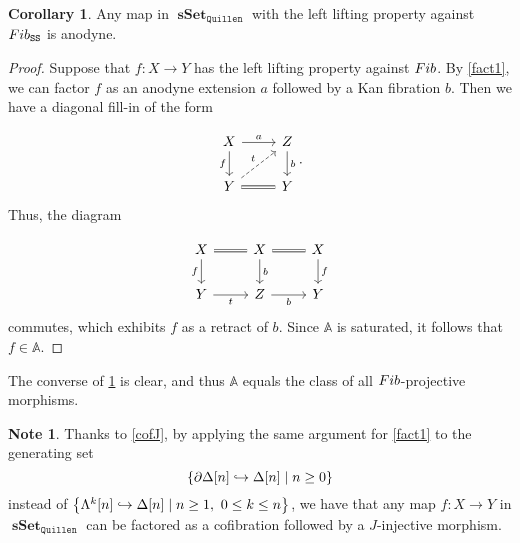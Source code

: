 \documentclass[10pt,letterpaper,cm]{nupset}
\theoremstyle{definition}
\newtheorem{note}[definition]{Note}
\theoremstyle{theorem}
\newtheorem{corollary}[definition]{Corollary}
\theoremstyle{remark}
\newcommand{\0}{\mathbf{0}}
\newcommand{\1}{\mathbf{1}}
\newcommand{\2}{\mathbf{2}}
\DeclareMathOperator{\sset}{\mathbf{sSet}}
\DeclareMathOperator{\fib}{\mathnormal{Fib}}
\begin{document}
\begin{corollary}\label{anocof}
Any map in $\sset_{\mathtt{Quillen}}$ with the left lifting property against $\fib_{\mathtt{SS}}$ is anodyne.
\end{corollary}
\begin{proof}
Suppose that $f: X \to Y$ has the left lifting property against $\fib$. By \cref{fact1}, we can factor $f$ as an anodyne extension $a$ followed by a Kan fibration $b$. Then we have a diagonal fill-in of the form

\[
\begin{tikzcd}
X \arrow[r, "a"] \arrow[d, "f"']    & Z \arrow[d, "b"] \\
Y \arrow[r, equal] \arrow[ru, "t", dashed] & Y               
\end{tikzcd}.
\] Thus, the diagram

\[
\begin{tikzcd}
X \arrow[r, equal] \arrow[d, "f"'] & X \arrow[r, equal] \arrow[d, "b"] & X \arrow[d, "f"] \\
Y \arrow[r, "t"']           & Z \arrow[r, "b"']          & Y               
\end{tikzcd}
\] 
commutes, which exhibits $f$ as a retract of $b$. Since $\mathbb{A}$ is saturated, it follows that $f\in \mathbb{A}$.
\end{proof}

\smallskip

The converse of \cref{anocof} is clear, and thus  $\mathbb{A}$ equals the class of all $\fib$-projective morphisms.

\smallskip 

\begin{note}
Thanks to \cref{cofJ}, by applying the same argument for \cref{fact1} to the generating set 
\[
\mleft\{\partial{\Delta[n]} \hookrightarrow \Delta[n] \mid n \geq 0\mright\}
\] instead of  $\mleft\{\Lambda^k[n] \hookrightarrow \Delta[n] \mid n \geq 1, \ 0\leq k \leq n\mright\}$, we have that any map $f: X \to Y$ in $\sset_{\mathtt{Quillen}}$ can be factored as a cofibration followed by a $J$-injective morphism.
\end{note}

\smallskip
\end{document}
